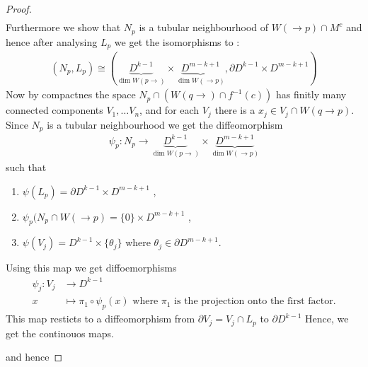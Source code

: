 \begin{proof}
\begin{align*}
    \end{align*} 
 Furthermore we show that $N_p$ is a tubular neighbourhood of $W(\to p)\cap M^c$ and hence after analysing $L_p$ we get the isomorphisms to : 
 \begin{align*}
     (N_p,L_p)\cong (\underbrace{D^{k-1}}_{\dim W(p \to)}\times \underbrace{D^{m-k+1}}_{\dim W(\to p)},\partial D^{k-1}\times D^{m-k+1})
 \end{align*}
 Now by compactnes the space $N_p\cap (W(q\to)\cap f^{-1}(c))$ has finitly many connected components $V_1,\dots V_n$, and for each $V_j$ there is a $x_j\in V_j\cap W(q\to p)$.
 Since $N_p$ is a tubular neighbourhood we get the diffeomorphism 
 \begin{align*}
     \psi_p:N_p\to \underbrace{D^{k-1}}_{\dim W(p \to)}\times \underbrace{D^{m-k+1}}_{\dim W(\to p)}
 \end{align*} such that
 \begin{enumerate}
     \item $\psi(L_p)=\partial D^{k-1}\times D^{m-k+1}$ ,
     \item $\psi_p(N_p\cap W(\to p)=\{0\}\times D^{m-k+1}$ ,
     \item $\psi(V_j)=D^{k-1}\times \{\theta_j\}$ where $\theta_j\in \partial D^{m-k+1}$.
 \end{enumerate}
 Using this map we get diffoemorphisms 
 \begin{align*}
     \psi_j:   V_j &\to D^{k-1}\\
     x             &\mapsto \pi_1\circ \psi_p(x) \text{ where $\pi_1$ is the projection onto the first factor.}
 \end{align*} This map resticts to a diffeomorphism from $\partial V_j=V_j\cap L_p$ to $\partial D^{k-1}$  Hence, we get the continouos maps.
 \begin{center}
 \end{center} and hence 

\end{proof}
